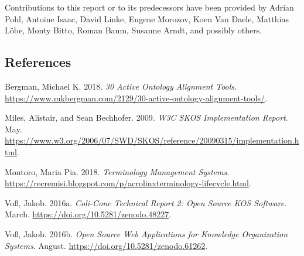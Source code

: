 \documentclass[
  DIV=10]{article}
\newlength{\cslhangindent}
\newenvironment{CSLReferences}[2] %
 {\begin{list}{}{%
  \setlength{\itemindent}{0pt}
  \setlength{\leftmargin}{0pt}
  \setlength{\parsep}{0pt}
  \ifodd #1
   \setlength{\leftmargin}{\cslhangindent}
   \setlength{\itemindent}{-1\cslhangindent}
  \fi
  \setlength{\itemsep}{#2\baselineskip}}}
 {\end{list}}
\begin{document}
Contributions to this report or to its predecessors have been provided
by Adrian Pohl, Antoine Isaac, David Linke, Eugene Morozov, Koen Van
Daele, Matthias Löbe, Monty Bitto, Roman Baum, Susanne Arndt, and
possibly others.

\subsection{References}\label{references}

\protect{}\label{refs}
\begin{CSLReferences}{1}{1}
Bergman, Michael K. 2018. \emph{30 Active Ontology Alignment Tools}.
\url{https://www.mkbergman.com/2129/30-active-ontology-alignment-tools/}.

Miles, Alistair, and Sean Bechhofer. 2009. \emph{W3C SKOS Implementation
Report}. May.
\url{https://www.w3.org/2006/07/SWD/SKOS/reference/20090315/implementation.html}.

Montoro, Maria Pia. 2018. \emph{Terminology Management Systems}.
\url{https://recremisi.blogspot.com/p/acrolinxterminology-lifecycle.html}.

Voß, Jakob. 2016a. \emph{Coli-Conc {Technical} {Report} 2: {Open}
{Source} {KOS} Software}. March.
\url{https://doi.org/10.5281/zenodo.48227}.

Voß, Jakob. 2016b. \emph{Open {Source} Web Applications for {Knowledge}
{Organization} {Systems}}. August.
\url{https://doi.org/10.5281/zenodo.61262}.

\end{CSLReferences}
\end{document}
